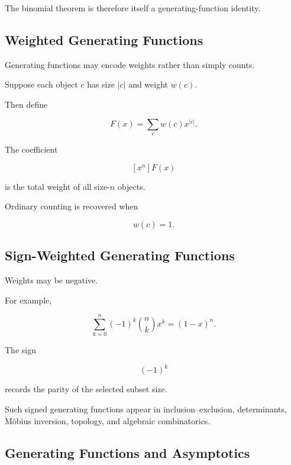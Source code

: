 The binomial theorem is therefore itself a generating-function identity.

\subsection{Weighted Generating Functions}
\label{subsec:weighted-generating-functions}

Generating functions may encode weights rather than simply counts.

Suppose each object \(c\) has size \(|c|\) and weight \(w(c)\).

Then define

\[
\boxed{
F(x)
=
\sum_{c}
w(c)x^{|c|}.
}
\]

The coefficient

\[
[x^n]F(x)
\]

is the total weight of all size-\(n\) objects.

Ordinary counting is recovered when

\[
w(c)=1.
\]

\subsection{Sign-Weighted Generating Functions}
\label{subsec:sign-weighted-generating-functions}

Weights may be negative.

For example,

\[
\sum_{k=0}^{n}
(-1)^k
\binom{n}{k}
x^k
=
(1-x)^n.
\]

The sign

\[
(-1)^k
\]

records the parity of the selected subset size.

Such signed generating functions appear in inclusion--exclusion,
determinants, Möbius inversion, topology, and algebraic combinatorics.

\subsection{Generating Functions and Asymptotics}
\label{subsec:gf-asymptotics-preview}

